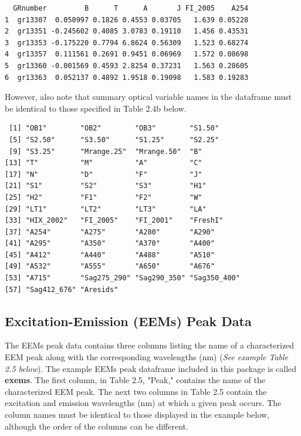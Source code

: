 \documentclass[a4paper,11pt]{article}\usepackage[]{graphicx}\usepackage[]{color}
\makeatletter
\newenvironment{kframe}{%
 \def\at@end@of@kframe{}%
 \ifinner\ifhmode%
  \def\at@end@of@kframe{\end{minipage}}%
  \begin{minipage}{\columnwidth}%
 \fi\fi%
 \def\FrameCommand##1{\hskip\@totalleftmargin \hskip-\fboxsep
 \colorbox{shadecolor}{##1}\hskip-\fboxsep
     \hskip-\linewidth \hskip-\@totalleftmargin \hskip\columnwidth}%
 \MakeFramed {\advance\hsize-\width
   \@totalleftmargin\z@ \linewidth\hsize
   \@setminipage}}%
 {\par\unskip\endMakeFramed%
 \at@end@of@kframe}
\newenvironment{knitrout}{}{} %
\makeatother
\begin{document}
\begin{knitrout}
\color{fgcolor}\begin{kframe}
\begin{verbatim}
  GRnumber         B      T      A       J FI_2005    A254
1  gr13307  0.050997 0.1826 0.4553 0.03705   1.639 0.05228
2  gr13351 -0.245602 0.4085 3.0783 0.19110   1.456 0.43531
3  gr13353 -0.175220 0.7794 6.8624 0.56309   1.523 0.68274
4  gr13357  0.111561 0.2691 0.9451 0.06969   1.572 0.08698
5  gr13360 -0.001569 0.4593 2.8254 0.37231   1.563 0.28605
6  gr13363  0.052137 0.4892 1.9518 0.19098   1.583 0.19283
\end{verbatim}
\end{kframe}
\end{knitrout}

However, also note that summary optical variable names in the dataframe must be identical to those specified in Table 2.4b below. 

\begin{knitrout}
\color{fgcolor}\begin{kframe}
\begin{verbatim}
 [1] "OB1"        "OB2"        "OB3"        "S1.50"     
 [5] "S2.50"      "S3.50"      "S1.25"      "S2.25"     
 [9] "S3.25"      "Mrange.25"  "Mrange.50"  "B"         
[13] "T"          "M"          "A"          "C"         
[17] "N"          "D"          "F"          "J"         
[21] "S1"         "S2"         "S3"         "H1"        
[25] "H2"         "F1"         "F2"         "W"         
[29] "LT1"        "LT2"        "LT3"        "LA"        
[33] "HIX_2002"   "FI_2005"    "FI_2001"    "FreshI"    
[37] "A254"       "A275"       "A280"       "A290"      
[41] "A295"       "A350"       "A370"       "A400"      
[45] "A412"       "A440"       "A488"       "A510"      
[49] "A532"       "A555"       "A650"       "A676"      
[53] "A715"       "Sag275_290" "Sag290_350" "Sag350_400"
[57] "Sag412_676" "Aresids"   
\end{verbatim}
\end{kframe}
\end{knitrout}

\subsection{Excitation-Emission (EEMs) Peak Data}
The EEMs peak data contains three columns listing the name of a characterized EEM peak along with the corresponding wavelengths (nm) (\emph{See example Table 2.5 below}). The example EEMs peak dataframe included in this package is called \textbf{ex\textunderscore ems}. The first column, in Table 2.5, "Peak," contains the name of the characterized EEM peak. The next two columns in Table 2.5 contain the excitation and emission wavelengths (nm) at which a given peak occurs. The column names must be identical to those displayed in the example below, although the order of the columns can be different. 
\end{document}
